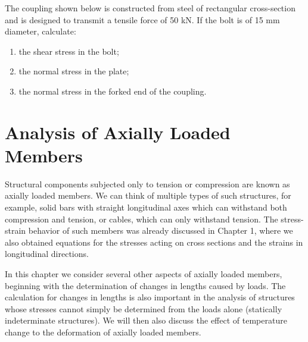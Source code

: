 \documentclass[
10pt,
a4paper,
openany,
svgnames,
]{book} %
\begin{document}
\begin{exercises}
  \item The coupling shown below is constructed from steel of rectangular cross-section and is designed to transmit a tensile force of 50 kN. If the bolt is of 15 mm diameter, calculate:
  \begin{enumerate}
  \item the shear stress in the bolt;
  \item the normal stress in the plate;
  \item the normal stress in the forked end of the coupling.
  \end{enumerate}

  \begin{figure}[H]
    \centering
  \end{figure}
\end{exercises}

\chapter{Analysis of Axially Loaded Members}

Structural components subjected only to tension or compression are known as axially loaded members. We can think of multiple types of such structures, for example, solid bars with straight longitudinal axes which can withstand both compression and tension, or cables, which can only withstand tension. The stress-strain behavior of such members was already discussed in Chapter 1, where we also obtained equations for the stresses acting on cross sections and the strains in longitudinal directions.

In this chapter we consider several other aspects of axially loaded members, beginning with the determination of changes in lengths caused by loads. The calculation for changes in lengths is also important in the analysis of structures whose stresses cannot simply be determined from the loads alone (statically indeterminate structures). We will then also discuss the effect of temperature change to the deformation of axially loaded members.
\end{document}
